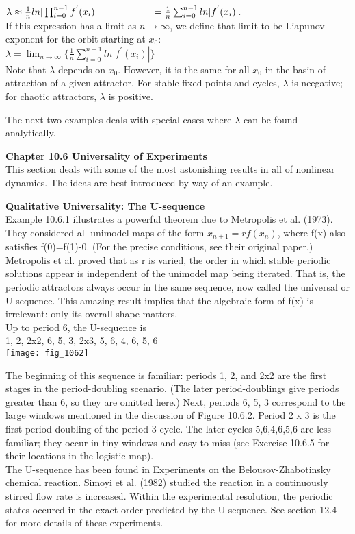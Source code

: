 \documentclass{article}
\newcommand\tab[1][1cm]{\hspace*{#1}}
\begin{document}
$\lambda \approx \frac{1}{n}ln|\prod_{i=0}^{n-1}f^{'}(x_{i})| \\ \tab \tab
= \frac{1}{n}\sum_{i=0}^{n-1}ln|f^{'}(x_{i})|.$ \\

If this expression has a limit as $n \to \infty$, we define that limit to be Liapunov exponent for the orbit starting at $x_{0}$: \\ \tab \tab
$\lambda = \lim_{n \to \infty} \{ \frac{1}{n} \sum_{i=0}^{n-1} ln|f^{'}(x_{i})|\}$ \\

Note that $\lambda$ depends on $x_{0}$. However, it is the same for all $x_{0}$ in the basin of attraction of a given attractor. For stable fixed points and cycles, $\lambda$ is neegative; for chaotic attractors, $\lambda$ is positive. \\ \tab

The next two examples deals with special cases where $\lambda$ can be found analytically.

\textbf {Chapter 10.6 Universality of Experiments} \\
This section deals with some of the most astonishing results in all of nonlinear dynamics. The ideas are best introduced by way of an example.

\textbf {Qualitative Universality: The U-sequence} \\ \tab
Example 10.6.1 illustrates a powerful theorem due to Metropolis et al. (1973). They considered all unimodel maps of the form $x_{n+1}=rf(x_{n})$, where f(x) also satisfies f(0)=f(1)-0. (For the precise conditions, see their original paper.) Metropolis et al. proved that as r is varied, the order in which stable periodic solutions appear is independent of the unimodel map being iterated. That is, the periodic attractors always occur in the same sequence, now called the universal or U-sequence. This amazing result implies that the algebraic form of f(x) is irrelevant: only its overall shape matters. \\ \tab
Up to period 6, the U-sequence is \\ \tab \tab
1, 2, 2x2, 6, 5, 3, 2x3, 5, 6, 4, 6, 5, 6 \\

\texttt{[image: fig\_1062]}

The beginning of this sequence is familiar: periods 1, 2, and 2x2 are the first stages in the period-doubling scenario. (The later period-doublings give periods greater than 6, so they are omitted here.) Next, periods 6, 5, 3 correspond to the large windows mentioned in the discussion of Figure 10.6.2. Period 2 x 3 is the first period-doubling of the period-3 cycle. The later cycles 5,6,4,6,5,6 are less familiar; they occur in tiny windows and easy to miss (see Exercise 10.6.5 for their locations in the logistic map). \\ \tab
The U-sequence has been found in Experiments on the Belousov-Zhabotinsky chemical reaction. Simoyi et al. (1982) studied the reaction in a continuously stirred flow rate is increased. Within the experimental resolution, the periodic states occured in the exact order predicted by the U-sequence. See section 12.4 for more details of these experiments. \\ \tab
\end{document}
